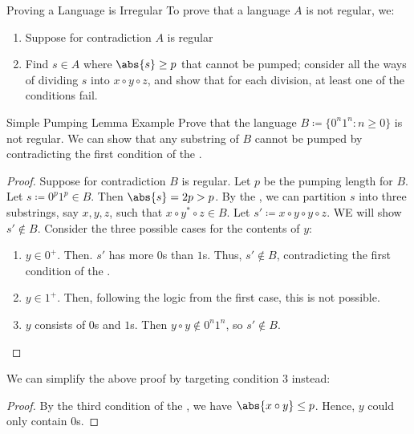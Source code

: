 \documentclass[12pt]{report}
\begin{document}
\begin{tecbox}{Proving a Language is Irregular}{}
    To prove that a language $A$ is not regular, we:
    \begin{enumerate}
        \item Suppose for contradiction $A$ is regular
        \item Find $s \in A$ where $\abs{s} \geq p$ that cannot be pumped; consider all the ways of dividing $s$ into $x \circ y \circ z$, and show that for each division, at least one of the conditions fail.
    \end{enumerate}
\end{tecbox}

\begin{exbox}{Simple Pumping Lemma Example}{}
    Prove that the language $B \coloneq \{ 0^n 1^n : n \geq 0 \}$ is not regular.
    \tcblower
    We can show that any substring of $B$ cannot be pumped by contradicting the first condition of the .
    \begin{proof}
        Suppose for contradiction $B$ is regular. Let $p$ be the pumping length for $B$. Let $s \coloneq 0^p1^p \in B$. Then $\abs{s} = 2p > p$. By the , we can partition $s$ into three substrings, say $x,y,z$, such that $x \circ y^* \circ z \in B$. Let $s\prime \coloneq x \circ y \circ y \circ z$. WE will show $s\prime \notin B$. Consider the three possible cases for the contents of $y$:
        \begin{enumerate}
            \item $y \in 0^+$. Then. $s\prime$ has more $0$s than $1$s. Thus, $s\prime \notin B$, contradicting the first condition of the .
            \item $y \in 1^+$. Then, following the logic from the first case, this is not possible.
            \item $y$ consists of $0$s and $1$s. Then $y \circ y \notin 0^n1^n$, so $s \prime \notin B$.
        \end{enumerate}
    \end{proof}

    We can simplify the above proof by targeting condition 3 instead:
    \begin{proof}
        By the third condition of the , we have $\abs{x \circ y} \leq p$. Hence, $y$ could only contain $0$s.
    \end{proof}
\end{exbox}
\end{document}
